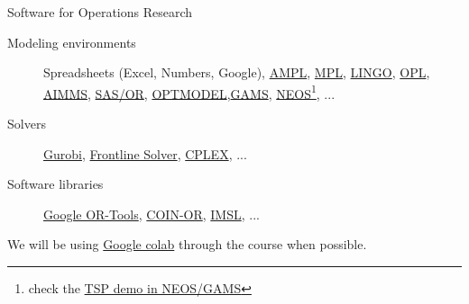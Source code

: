 \documentclass[c]{beamer}
\begin{document}
\begin{frame}{Software for Operations Research}
 \begin{description}
   \item[Modeling environments] Spreadsheets (Excel, Numbers, Google), \href{https://ampl.com}{AMPL}, \href{http://www.maximalsoftware.com/mpl/}{MPL}, \href{https://www.lindo.com/index.php/products/lingo-and-optimization-modeling}{LINGO}, \href{https://www.ibm.com/docs/en/icos/12.9.0?topic=opl-optimization-programming-language}{OPL}, \href{https://www.aimms.com}{AIMMS}, \href{https://www.sas.com/es_es/software/or.html}{SAS/OR}, \href{https://support.sas.com/rnd/app/or/procedures/optmodel.html}{OPTMODEL},\href{https://www.gams.com}{GAMS}, \href{https://neos-guide.org}{NEOS}\footnote{check the \href{https://neos-guide.org/content/or}{TSP demo in NEOS/GAMS}}, ...
   \item[Solvers] \href{https://www.gurobi.com}{Gurobi},
   \href{https://www.solver.com}{Frontline Solver},
   \href{https://www.ibm.com/products/ilog-cplex-optimization-studio}{CPLEX}, ...
   \item[Software libraries] \href{https://developers.google.com/optimization}{Google OR-Tools}, \href{https://www.coin-or.org}{COIN-OR}, \href{https://www.imsl.com}{IMSL}, ...
 \end{description}
 We will be using \href{https://github.com/JordiVillaFreixa/ORcode}{Google colab} through the course when possible.
\end{frame}

\end{document}
